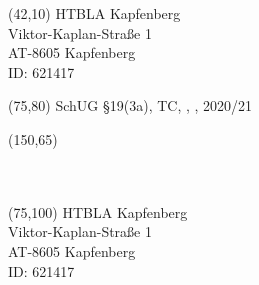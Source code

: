 \documentclass [8pt]{article}
\begin{document}
\pagestyle{empty}

{
\begin{textblock}{55}(42,10)
HTBLA Kapfenberg\\
Viktor-Kaplan-Straße 1\\
AT-8605 Kapfenberg\\
ID: 621417
\end{textblock}


\begin{textblock}{60}(75,80)
SchUG §19(3a), TC, \Klasse, \Schuler, 2020/21
\end{textblock}

\begin{textblock}{45}(150,65)
\AddrA\\
\AddrB\\
\AddrC\\
\AddrD
\end{textblock}


\begin{textblock}{55}(75,100)
HTBLA Kapfenberg\\
Viktor-Kaplan-Straße 1\\
AT-8605 Kapfenberg\\
ID: 621417
\end{textblock}


\newpage
}
\end{document}
